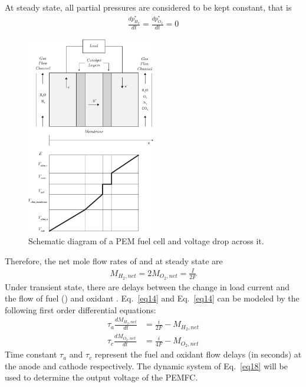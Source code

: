 \documentclass[11pt,a4paper]{article}
\numberwithin{equation}{section}
\theoremstyle{it}
\theoremstyle{definition}
\begin{document}
At steady state, all partial pressures are considered to be kept constant, that is 
\begin{equation}\label{eq16}
	\begin{aligned}
		\frac{dp_{H_2}^*}{dt} = \frac{dp_{O_2}^*}{dt} = 0
	\end{aligned}
\end{equation}
\begin{figure}[H]
	\centering
	\includegraphics[width = 0.5\textwidth, width = 250pt, angle = 0, keepaspectratio]{figures/pem_fuel_cell/pem_fuel_cell_1.eps}
	\captionsetup{width=0.5\textwidth}		
	\caption{Schematic diagram of a PEM fuel cell and voltage drop across it.}
	\label{pem_fc_1}
\end{figure}
Therefore, the net mole flow rates of  and  at steady state are 
\begin{equation}\label{eq17}
	\begin{aligned}
		M_{H_2,net} = 2M_{O_2,net} = \frac{I}{2F}
	\end{aligned}
\end{equation}
Under transient state, there are delays between the change in load current and the flow of fuel () and oxidant .
Eq.~\eqref{eq14} and Eq.~\eqref{eq14} can be modeled by the following first order differential equations:
\begin{equation}\label{eq18}
	\begin{aligned}
		\tau_{a}\frac{dM_{H_2,net}}{dt} &= \frac{i}{2F} - M_{H_2,net} \\[8pt]
		\tau_{c}\frac{dM_{O_2,net}}{dt} &= \frac{i}{4F} - M_{O_2,net}
	\end{aligned}
\end{equation}
Time constant $\tau_{a}$ and $\tau_{c}$ represent the fuel and oxidant flow delays (in seconds) at the anode and cathode respectively. The dynamic system of Eq.~\eqref{eq18} will be used to determine the output voltage of the PEMFC.
\end{document}
